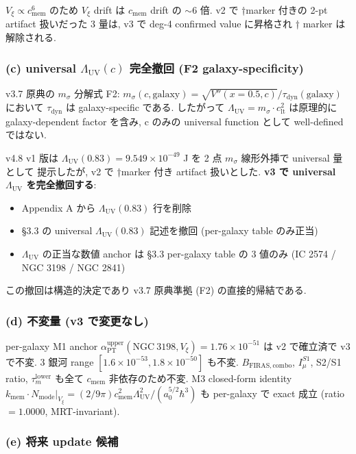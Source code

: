 \documentclass[11pt,a4paper]{ltjsarticle}
\newcommand{\kmem}{k_{\mathrm{mem}}}
\newcommand{\cmem}{c_{\mathrm{mem}}}
\newcommand{\Vxi}{V_{\xi}}
\newcommand{\Nmode}{N_{\mathrm{mode}}}
\newcommand{\aPT}{\alpha_{\mathrm{PT}}}
\newcommand{\taum}{\tau_{m}}
\newcommand{\Imu}{I_{\mu}}
\newcommand{\BFIRAS}{B_{\mathrm{FIRAS,combo}}}
\newcommand{\Lambdauv}{\Lambda_{\mathrm{UV}}}
\newcommand{\msigma}{m_{\sigma}}
\newcommand{\clt}{c_{\mathrm{lt}}}       %
\begin{document}
$\Vxi \propto \cmem^6$ のため $\Vxi$ drift は $\cmem$ drift の $\sim 6$ 倍. v2 で †marker 付きの
2-pt artifact 扱いだった 3 量は, v3 で deg-4 confirmed value に昇格され † marker は解除される.

\subsubsection*{(c) universal $\Lambdauv(c)$ 完全撤回 (F2 galaxy-specificity)}

v3.7 原典の $\msigma$ 分解式 F2: $\msigma(c, \mathrm{galaxy}) = \sqrt{V''(x=0.5, c)}/\tau_{\mathrm{dyn}}(\mathrm{galaxy})$
において $\tau_{\mathrm{dyn}}$ は galaxy-specific である. したがって
$\Lambdauv = \msigma \cdot \clt^2$ は原理的に galaxy-dependent factor を含み, c のみの universal function として
well-defined ではない.

v4.8 v1 版は $\Lambdauv(0.83) = 9.549 \times 10^{-49}$ J を 2 点 $\msigma$ 線形外挿で universal 量として
提示したが, v2 で †marker 付き artifact 扱いとした. \textbf{v3 で universal $\Lambdauv$ を完全撤回する}:

\begin{itemize}
\item Appendix A から $\Lambdauv(0.83)$ 行を削除
\item \S 3.3 の universal $\Lambdauv(0.83)$ 記述を撤回 (per-galaxy table のみ正当)
\item $\Lambdauv$ の正当な数値 anchor は \S 3.3 per-galaxy table の 3 値のみ (IC 2574 / NGC 3198 / NGC 2841)
\end{itemize}

この撤回は構造的決定であり v3.7 原典準拠 (F2) の直接的帰結である.

\subsubsection*{(d) 不変量 (v3 で変更なし)}

per-galaxy M1 anchor $\aPT^{\mathrm{upper}}(\mathrm{NGC~3198}, \Vxi) = 1.76 \times 10^{-51}$ は v2 で確立済で
v3 で不変. 3 銀河 range $[1.6\times10^{-53}, 1.8\times10^{-50}]$ も不変. $\BFIRAS$, $\Imu^{S1}$, S2/S1 ratio,
$\taum^{\mathrm{lower}}$ も全て $\cmem$ 非依存のため不変. M3 closed-form identity
$\kmem \cdot \Nmode|_{\Vxi} = (2/9\pi) \cmem^2 \Lambdauv^2/(a_0^{5/2}\hbar^3)$ も per-galaxy で exact 成立
(ratio $= 1.0000$, MRT-invariant).

\subsubsection*{(e) 将来 update 候補}
\end{document}
